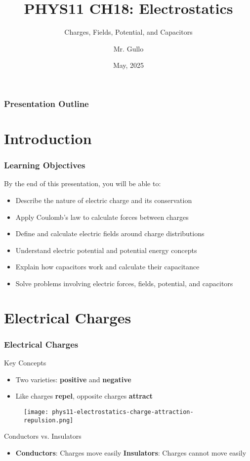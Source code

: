 \documentclass{beamer}
\title[Electric Forces \& Fields]{PHYS11 CH18: Electrostatics}
\subtitle{Charges, Fields, Potential, and Capacitors}
\author[Mr. Gullo]{Mr. Gullo}
\date[May 2025]{May, 2025}
\begin{document}
\begin{frame}
    \titlepage
\end{frame}

\begin{frame}
    \frametitle{Presentation Outline}
    \tableofcontents
\end{frame}

\section{Introduction}

\begin{frame}
    \frametitle{Learning Objectives}
    By the end of this presentation, you will be able to:
    \begin{itemize}
        \item Describe the nature of electric charge and its conservation
        \item Apply Coulomb's law to calculate forces between charges
        \item Define and calculate electric fields around charge distributions
        \item Understand electric potential and potential energy concepts
        \item Explain how capacitors work and calculate their capacitance
        \item Solve problems involving electric forces, fields, potential, and capacitors
    \end{itemize}
\end{frame}

\section{Electrical Charges}

\begin{frame}
    \frametitle{Electrical Charges}
    \begin{block}{Key Concepts}
        \begin{itemize}
                    \item Two varieties: \textbf{positive} and \textbf{negative}
            \item Like charges \textbf{repel}, opposite charges \textbf{attract}
        \end{itemize}
    \end{block}
    
    
        \begin{figure}
            \centering
            \texttt{[image: phys11-electrostatics-charge-attraction-repulsion.png]}
        \end{figure}
    
    
    \begin{block}{Conductors vs. Insulators}
        \begin{itemize}
            \item \textbf{Conductors}: Charges move easily \textbf{Insulators}: Charges cannot move easily
        \end{itemize}
    \end{block}
\end{frame}
\end{document}
